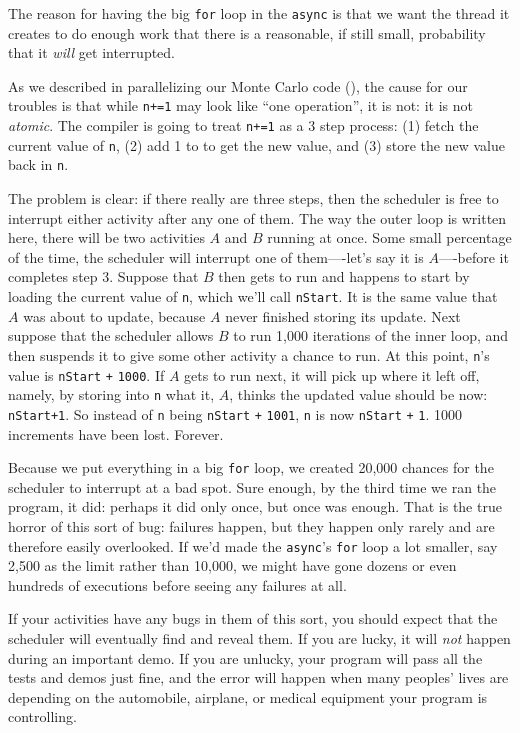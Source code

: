 \begin{finepoint}  
The reason for having the big {\tt for} loop in the {\tt async} is that we want the
thread it creates to do enough work that there is a reasonable, if still small, probability
that it {\em will} get interrupted.
\end{finepoint}  

As we described in parallelizing our Monte Carlo code (),
the cause for our troubles is that while {\tt n+=1}
may look like ``one operation'', it is not: it is not {\em atomic}.   The \Xten{}
compiler is going to treat {\tt n+=1} as a 3 step process: (1) fetch the current
value of {\tt n}, (2) add 1 to to get the new value,
and (3) store the new value back in {\tt n}.  

The problem is clear: if there really are three steps, then
the scheduler is free to interrupt either activity after any one of them.  The way
the outer loop is written here, there will be two activities $A$ and $B$ running at once.
Some small percentage of the time, the scheduler will interrupt one of them----let's
say it is $A$----before it completes step 3.  Suppose that $B$ then gets to run and happens
to start by loading the current value of {\tt n}, which we'll call {\tt nStart}.
It is the same value that $A$ was about
to update, because $A$ never finished storing its update.
Next suppose that the scheduler allows $B$ to run 1,000 iterations of the inner
loop, and then suspends it to give some other activity a chance to run.  At 
this point, {\tt n}'s value is  {\tt nStart} {\tt +} {\tt 1000}.
If $A$ gets to run next, it will pick up where it left off, namely, by storing into {\tt n} 
what it, $A$, thinks the updated value should be now: {\tt nStart+1}.
So instead of {\tt n} being {\tt nStart} {\tt +} {\tt 1001}, {\tt n} is now
{\tt nStart} {\tt +} {\tt 1}.  1000 increments have been lost.  Forever.

Because we put everything in a big {\tt for} loop,
we created 20,000 chances for the scheduler to interrupt at a bad spot.  Sure enough,
by the third time we ran the program, it did: perhaps it did only once, but once was enough.   
That is the true horror of this sort of bug: failures happen, but they happen only
rarely and are therefore easily overlooked.  If we'd made the {\tt async}'s {\tt for} loop a lot smaller,
say 2,500 as the limit rather than 10,000, we might have gone dozens or even
hundreds of executions before seeing any failures at all.

If your activities have any bugs in them of this sort, you should expect that
the scheduler will eventually find and
reveal them. If you are lucky, it will {\em not} happen during an important demo. If you
are unlucky, your program will pass all the tests and demos just fine, and the
error will happen when many peoples' lives are depending on the
automobile, airplane, or medical equipment your program is controlling. 

